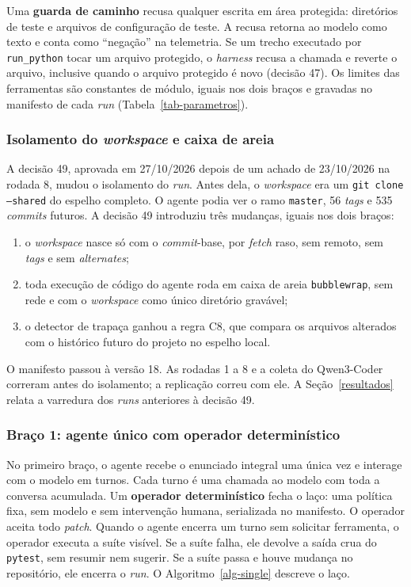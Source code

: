 Uma \textbf{guarda de caminho} recusa qualquer escrita em área protegida: diretórios de teste e arquivos de configuração de teste. A recusa retorna ao modelo como texto e conta como ``negação'' na telemetria. Se um trecho executado por \texttt{run\_python} tocar um arquivo protegido, o \textit{harness} recusa a chamada e reverte o arquivo, inclusive quando o arquivo protegido é novo (decisão 47). Os limites das ferramentas são constantes de módulo, iguais nos dois braços e gravadas no manifesto de cada \textit{run} (Tabela~\ref{tab-parametros}).

\subsubsection{Isolamento do \textit{workspace} e caixa de areia}
\label{ssec:isolamento}

A decisão 49, aprovada em 27/10/2026 depois de um achado de 23/10/2026 na rodada 8, mudou o isolamento do \textit{run}. Antes dela, o \textit{workspace} era um \texttt{git clone --shared} do espelho completo. O agente podia ver o ramo \texttt{master}, 56 \textit{tags} e 535 \textit{commits} futuros. A decisão 49 introduziu três mudanças, iguais nos dois braços:

\begin{enumerate}
    \item o \textit{workspace} nasce só com o \textit{commit}-base, por \textit{fetch} raso, sem remoto, sem \textit{tags} e sem \textit{alternates};
    \item toda execução de código do agente roda em caixa de areia \texttt{bubblewrap}, sem rede e com o \textit{workspace} como único diretório gravável;
    \item o detector de trapaça ganhou a regra C8, que compara os arquivos alterados com o histórico futuro do projeto no espelho local.
\end{enumerate}

O manifesto passou à versão 18. As rodadas 1 a 8 e a coleta do Qwen3-Coder correram antes do isolamento; a replicação correu com ele. A Seção~\ref{resultados} relata a varredura dos \textit{runs} anteriores à decisão 49.

\subsubsection{Braço 1: agente único com operador determinístico}

No primeiro braço, o agente recebe o enunciado integral uma única vez e interage com o modelo em turnos. Cada turno é uma chamada ao modelo com toda a conversa acumulada. Um \textbf{operador determinístico} fecha o laço: uma política fixa, sem modelo e sem intervenção humana, serializada no manifesto. O operador aceita todo \textit{patch}. Quando o agente encerra um turno sem solicitar ferramenta, o operador executa a suíte visível. Se a suíte falha, ele devolve a saída crua do \texttt{pytest}, sem resumir nem sugerir. Se a suíte passa e houve mudança no repositório, ele encerra o \textit{run}. O Algoritmo~\ref{alg-single} descreve o laço.

